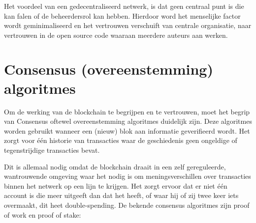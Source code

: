 Het voordeel van een gedecentraliseerd netwerk, is dat geen centraal punt is die kan falen of de beheerdersrol kan hebben. Hierdoor word het menselijke factor wordt geminimaliseerd en het vertrouwen verschuift van centrale organisatie, naar vertrouwen in de open source code waaraan meerdere auteurs aan werken\cite{stateNecessary}.
\newpage

\section{Consensus (overeenstemming) algoritmes}
Om de werking van de blockchain te begrijpen en te vertrouwen, moet het begrip van Consensus oftewel overeenstemming algoritmes  duidelijk zijn. Deze algoritmes worden gebruikt wanneer een (nieuw) blok aan informatie geverifieerd wordt. Het zorgt voor één historie van transacties waar de geschiedenis geen ongeldige of tegenstrijdige transacties bevat.\par

Dit is allemaal nodig omdat de blockchain draait in een zelf gereguleerde, wantrouwende omgeving waar het nodig is om meningsverschillen over transacties binnen het netwerk op een lijn te krijgen. Het zorgt ervoor dat er niet één account is die meer uitgeeft dan dat het heeft, of waar hij of zij twee keer iets overmaakt, dit heet double-spending. De bekende consensus algoritmes zijn proof of work en proof of stake:\par

